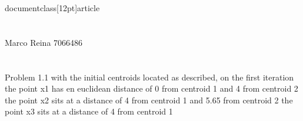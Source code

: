 documentclass[12pt]{article}
\usepackage{graphicx} %
\usepackage{amsmath}
\usepackage{amssymb}
\usepackage{hyperref}%
\usepackage{mathrsfs}



\section*{}
Marco Reina 7066486 \newline
\section*{}

Problem 1.1 \newline
	with the initial centroids located as described, on the first iteration
	the point x1 has en euclidean distance of 0 from centroid 1 and 4 from centroid 2
	the point x2 sits at a distance of 4 from centroid 1 and 5.65 from centroid 2
	the point x3 sits at a distance of 4 from centroid 1







